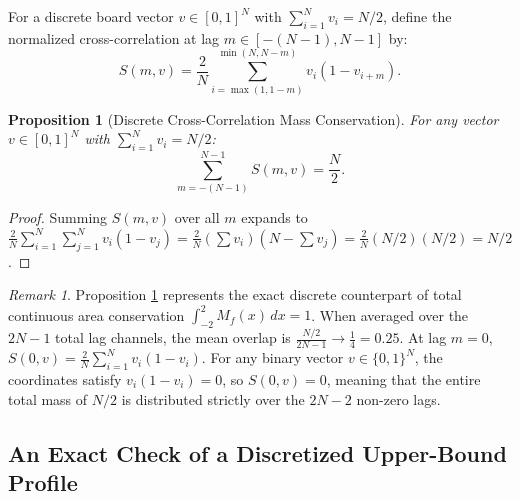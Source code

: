 \documentclass[11pt,a4paper]{article}
\newtheorem{proposition}[theorem]{Proposition}
\theoremstyle{definition}
\theoremstyle{remark}
\newtheorem{remark}[theorem]{Remark}
\begin{document}
For a discrete board vector $v \in [0, 1]^N$ with $\sum_{i=1}^N v_i = N/2$, define the normalized cross-correlation at lag $m \in [-(N-1), N-1]$ by:
\begin{equation}
S(m, v) = \frac{2}{N} \sum_{i = \max(1, 1-m)}^{\min(N, N-m)} v_i (1 - v_{i+m}).
\end{equation}
\begin{proposition}[Discrete Cross-Correlation Mass Conservation]
\label{prop:discrete_mass}
For any vector $v \in [0, 1]^N$ with $\sum_{i=1}^N v_i = N/2$:
\begin{equation}
\sum_{m = -(N-1)}^{N-1} S(m, v) = \frac{N}{2}.
\end{equation}
\end{proposition}
\begin{proof}
Summing $S(m, v)$ over all $m$ expands to $\frac{2}{N} \sum_{i=1}^N \sum_{j=1}^N v_i(1 - v_j) = \frac{2}{N} (\sum v_i)(N - \sum v_j) = \frac{2}{N} (N/2)(N/2) = N/2$.
\end{proof}

\begin{remark}
Proposition \ref{prop:discrete_mass} represents the exact discrete counterpart of total continuous area conservation $\int_{-2}^2 M_f(x) \, dx = 1$. When averaged over the $2N - 1$ total lag channels, the mean overlap is $\frac{N/2}{2N - 1} \to \frac{1}{4} = 0.25$. At lag $m = 0$, $S(0, v) = \frac{2}{N} \sum_{i=1}^N v_i(1 - v_i)$. For any binary vector $v \in \{0, 1\}^N$, the coordinates satisfy $v_i(1 - v_i) = 0$, so $S(0, v) = 0$, meaning that the entire total mass of $N/2$ is distributed strictly over the $2N - 2$ non-zero lags.
\end{remark}

\subsection{An Exact Check of a Discretized Upper-Bound Profile}
\label{subsec:profile}
\end{document}
